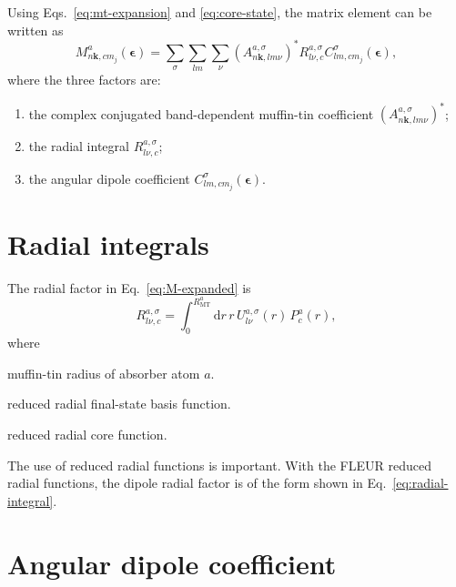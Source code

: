 \documentclass[11pt,a4paper]{article}
\newcommand{\dd}{\mathrm{d}}
\newcommand{\kvec}{\mathbf{k}}
\newcommand{\epsvec}{\boldsymbol{\epsilon}}
\newcommand{\mt}{\mathrm{MT}}
\newcommand{\absr}{a}
\newcommand{\sig}{\sigma}
\begin{document}
Using Eqs.~\eqref{eq:mt-expansion} and \eqref{eq:core-state}, the matrix element
can be written as
\begin{equation}
\label{eq:M-expanded}
  M^{\absr}_{n\kvec,c m_j}(\epsvec)
  =
  \sum_{\sig}
  \sum_{l m}
  \sum_{\nu}
  \left(A^{\absr,\sig}_{n\kvec,lm\nu}\right)^{*}
  R^{\absr,\sig}_{l\nu,c}
  C^{\sig}_{lm,c m_j}(\epsvec),
\end{equation}
where the three factors are:
\begin{enumerate}[label=(\roman*)]
  \item the complex conjugated band-dependent muffin-tin coefficient
  \(\left(A^{\absr,\sig}_{n\kvec,lm\nu}\right)^{*}\);
  \item the radial integral \(R^{\absr,\sig}_{l\nu,c}\);
  \item the angular dipole coefficient \(C^{\sig}_{lm,c m_j}(\epsvec)\).
\end{enumerate}

\section{Radial integrals}

The radial factor in Eq.~\eqref{eq:M-expanded} is
\begin{equation}
\label{eq:radial-integral}
  R^{\absr,\sig}_{l\nu,c}
  =
  \int_0^{R_{\mt}^{\absr}}
  \dd r\,
  r\,
  U^{\absr,\sig}_{l\nu}(r)\,
  P^{\absr}_{c}(r),
\end{equation}
where
\begin{description}[leftmargin=2.7cm,style=nextline]
  \item[\(R_{\mt}^{\absr}\)] muffin-tin radius of absorber atom \(\absr\).
  \item[\(U^{\absr,\sig}_{l\nu}(r)\)] reduced radial final-state basis function.
  \item[\(P^{\absr}_{c}(r)\)] reduced radial core function.
\end{description}
The use of reduced radial functions is important. With the FLEUR reduced radial
functions, the dipole radial factor is of the form shown in
Eq.~\eqref{eq:radial-integral}.

\section{Angular dipole coefficient}
\end{document}
